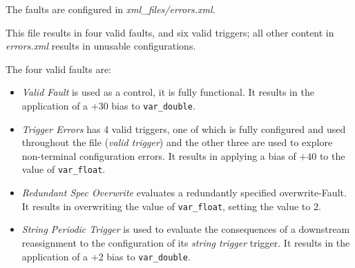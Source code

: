 \documentclass[11pt,fleqn]{report}
\begin{document}
The faults are configured in \textit{xml\_files/errors.xml}.

This file results in four valid faults, and six valid triggers; all other
content in \textit{errors.xml} results in unusable configurations.

The four valid faults are:
\begin{itemize}
  \item \textit{Valid Fault} is used as a control, it is fully functional.
        It results in the
        application of a $+30$ bias to \verb'var_double'.
  \item \textit{Trigger Errors} has 4 valid triggers, one of which is fully
        configured and used throughout the file (\textit{valid trigger})
        and the other three are used to explore non-terminal configuration
        errors. It results in applying a bias of $+40$ to the value of
        \verb'var_float'.
  \item \textit{Redundant Spec Overwrite} evaluates a redundantly specified
        overwrite-Fault. It results in overwriting the value of
        \verb'var_float', setting the value to $2$.
  \item \textit{String Periodic Trigger} is used to evaluate the consequences
        of a downstream reassignment to the configuration of its
        \textit{string trigger} trigger. It results in the application of
        a $+2$ bias to \verb'var_double'.
\end{itemize}
\end{document}
